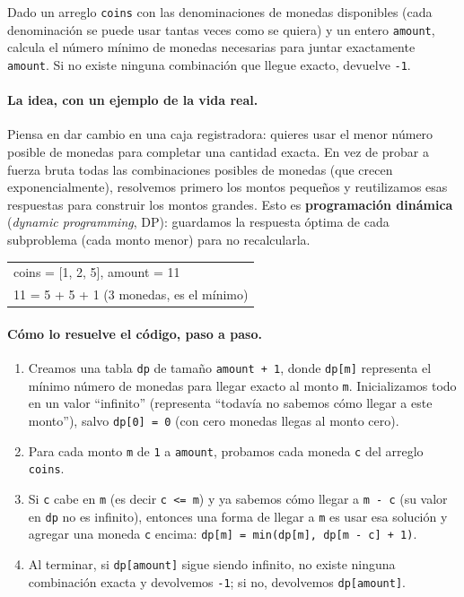 
Dado un arreglo \texttt{coins} con las denominaciones de monedas disponibles
(cada denominación se puede usar tantas veces como se quiera) y un entero
\texttt{amount}, calcula el número mínimo de monedas necesarias para juntar
exactamente \texttt{amount}. Si no existe ninguna combinación que llegue
exacto, devuelve \texttt{-1}.

\paragraph{La idea, con un ejemplo de la vida real.} Piensa en dar cambio en
una caja registradora: quieres usar el menor número posible de monedas para
completar una cantidad exacta. En vez de probar a fuerza bruta todas las
combinaciones posibles de monedas (que crecen exponencialmente), resolvemos
primero los montos pequeños y reutilizamos esas respuestas para construir los
montos grandes. Esto es \textbf{programación dinámica} (\emph{dynamic
programming}, DP): guardamos la respuesta óptima de cada subproblema (cada
monto menor) para no recalcularla.

\begin{center}
\ttfamily
\begin{tabular}{l}
coins = [1, 2, 5], amount = 11\\
11 = 5 + 5 + 1 (3 monedas, es el mínimo)\\
\end{tabular}
\end{center}

\paragraph{Cómo lo resuelve el código, paso a paso.}
\begin{enumerate}
  \item Creamos una tabla \texttt{dp} de tamaño \texttt{amount + 1}, donde
        \texttt{dp[m]} representa el mínimo número de monedas para llegar
        exacto al monto \texttt{m}. Inicializamos todo en un valor
        ``infinito'' (representa ``todavía no sabemos cómo llegar a este
        monto''), salvo \texttt{dp[0] = 0} (con cero monedas llegas al monto
        cero).
  \item Para cada monto \texttt{m} de \texttt{1} a \texttt{amount},
        probamos cada moneda \texttt{c} del arreglo \texttt{coins}.
  \item Si \texttt{c} cabe en \texttt{m} (es decir \texttt{c <= m}) y ya
        sabemos cómo llegar a \texttt{m - c} (su valor en \texttt{dp} no es
        infinito), entonces una forma de llegar a \texttt{m} es usar esa
        solución y agregar una moneda \texttt{c} encima:
        \texttt{dp[m] = min(dp[m], dp[m - c] + 1)}.
  \item Al terminar, si \texttt{dp[amount]} sigue siendo infinito, no existe
        ninguna combinación exacta y devolvemos \texttt{-1}; si no,
        devolvemos \texttt{dp[amount]}.
\end{enumerate}

